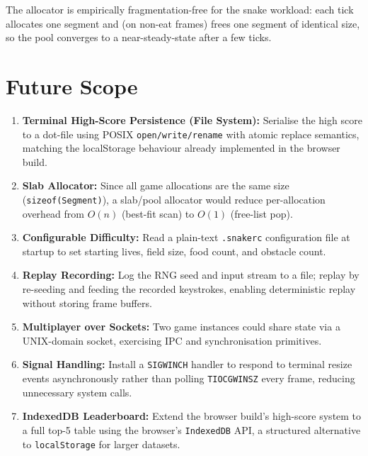 \documentclass[conference]{IEEEtran}
\begin{document}
\noindent The allocator is empirically fragmentation-free for the snake
workload: each tick allocates one segment and (on non-eat frames) frees one
segment of identical size, so the pool converges to a near-steady-state after
a few ticks.

\section{Future Scope}
\label{sec:future}

\begin{enumerate}
  \item \textbf{Terminal High-Score Persistence (File System):}
        Serialise the high score to a dot-file using POSIX
        \texttt{open/write/rename} with atomic replace semantics, matching
        the localStorage behaviour already implemented in the browser build.
  \item \textbf{Slab Allocator:}
        Since all game allocations are the same size (\texttt{sizeof(Segment)}),
        a slab/pool allocator \cite{bonwick1994slab} would reduce per-allocation
        overhead from $O(n)$ (best-fit scan) to $O(1)$ (free-list pop).
  \item \textbf{Configurable Difficulty:}
        Read a plain-text \texttt{.snakerc} configuration file at startup to
        set starting lives, field size, food count, and obstacle count.
  \item \textbf{Replay Recording:}
        Log the RNG seed and input stream to a file; replay by re-seeding
        and feeding the recorded keystrokes, enabling deterministic replay
        without storing frame buffers.
  \item \textbf{Multiplayer over Sockets:}
        Two game instances could share state via a UNIX-domain socket,
        exercising IPC and synchronisation primitives.
  \item \textbf{Signal Handling:}
        Install a \texttt{SIGWINCH} handler to respond to terminal resize
        events asynchronously rather than polling \texttt{TIOCGWINSZ} every
        frame, reducing unnecessary system calls.
  \item \textbf{IndexedDB Leaderboard:}
        Extend the browser build's high-score system to a full top-5 table
        using the browser's \texttt{IndexedDB} API, a structured alternative
        to \texttt{localStorage} for larger datasets.
\end{enumerate}
\end{document}
